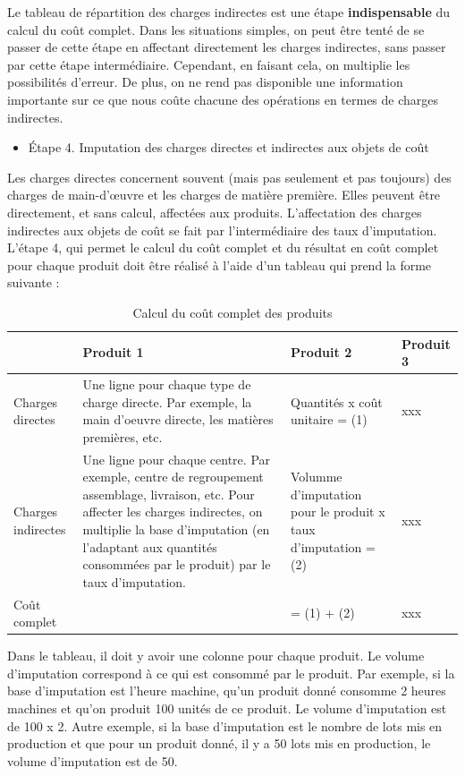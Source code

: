 \documentclass[oneside]{kaobook}
\begin{document}
\begin{kaowarn}
Le tableau de répartition des charges indirectes est une étape \textbf{indispensable} du calcul du coût complet. Dans les situations simples, on peut être tenté de se passer de cette étape en affectant directement les charges indirectes, sans passer par cette étape intermédiaire. Cependant, en faisant cela, on multiplie les possibilités d'erreur. De plus, on ne rend pas disponible une information importante sur ce que nous coûte chacune des opérations en termes de charges indirectes.
\end{kaowarn}
\begin{itemize}
\item Étape 4. Imputation des charges directes et indirectes aux objets de coût
\end{itemize}
Les charges directes concernent souvent (mais pas seulement et pas toujours) des charges de main-d'œuvre et les charges de matière première. Elles peuvent être directement, et sans calcul, affectées aux produits.
L'affectation des charges indirectes aux objets de coût se fait par l'intermédiaire des taux d'imputation. 
L'étape 4, qui permet le calcul du coût complet et du résultat en coût complet pour chaque produit doit être réalisé à l'aide d'un tableau qui prend la forme suivante :
\begin{table}[htbp]
\caption{Calcul du coût complet des produits}
\centering
\sidenotesize
\begin{tabular}{p{2cm} p{5cm} p{2cm} p{2cm}}
 & Produit 1 & Produit 2 & Produit 3\\
\hline
Charges directes & Une ligne pour chaque type de charge directe. Par exemple, la main d'oeuvre directe, les matières premières, etc. & Quantités x coût unitaire = (1) & xxx\\
Charges indirectes & Une ligne pour chaque centre. Par exemple, centre de regroupement assemblage, livraison, etc. Pour affecter les charges indirectes, on multiplie la base d'imputation (en l'adaptant aux quantités consommées par le produit) par le taux d'imputation. & Volumme d'imputation pour le produit x taux d'imputation = (2) & xxx\\
Coût complet &  & = (1) + (2) & xxx\\
\end{tabular}
\end{table}
Dans le tableau, il doit y avoir une colonne pour chaque produit. Le volume d'imputation correspond à ce qui est consommé par le produit. Par exemple, si la base d'imputation est l'heure machine, qu'un produit donné consomme 2 heures machines et qu'on produit 100 unités de ce produit. Le volume d'imputation est de 100 x 2. Autre exemple, si la base d'imputation est le nombre de lots mis en production et que pour un produit donné, il y a 50 lots mis en production, le volume d'imputation est de 50.
\end{document}
